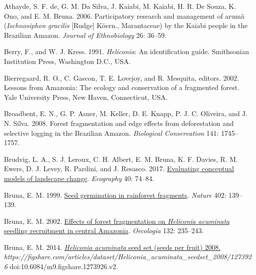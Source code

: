 \documentclass[
  12pt,
  man, donotrepeattitle,floatsintext]{apa6}
\newlength{\cslhangindent}
\newlength{\cslentryspacingunit} %
\newenvironment{CSLReferences}[2] %
 {%
  \setlength{\parindent}{0pt}
  \ifodd #1
  \let\oldpar\par
  \def\par{\hangindent=\cslhangindent\oldpar}
  \fi
  \setlength{\parskip}{#2\cslentryspacingunit}
 }%
 {}
\begin{document}
\hypertarget{refs}{}
\begin{CSLReferences}{1}{0}
\leavevmode{}%
Athayde, S. F. de, G. M. Da Silva, J. Kaiabi, M. Kaiabi, H. R. De Souza, K. Ono, and E. M. Bruna. 2006. Participatory research and management of arumã (\emph{{Ischnosiphon} gracilis} {[}{Rudge}{]} {Köern}., {Marantaceae}) by the {Kaiabi} people in the {Brazilian} {Amazon}. \emph{Journal of Ethnobiology} 26: 36--59.

\leavevmode{}%
Berry, F., and W. J. Kress. 1991. \emph{Heliconia}: An identification guide. Smithsonian Institution Press, Washington D.C., USA.

\leavevmode{}%
Bierregaard, R. O., C. Gascon, T. E. Lovejoy, and R. Mesquita, editors. 2002. Lessons from {Amazonia}: The ecology and conservation of a fragmented forest. Yale University Press, New Haven, Connecticut, USA.

\leavevmode{}%
Broadbent, E. N., G. P. Asner, M. Keller, D. E. Knapp, P. J. C. Oliveira, and J. N. Silva. 2008. Forest fragmentation and edge effects from deforestation and selective logging in the {Brazilian} {Amazon}. \emph{Biological Conservation} 141: 1745--1757.

\leavevmode{}%
Brudvig, L. A., S. J. Leroux, C. H. Albert, E. M. Bruna, K. F. Davies, R. M. Ewers, D. J. Levey, R. Pardini, and J. Resasco. 2017. \href{https://doi.org/10.1111/ecog.02543}{Evaluating conceptual models of landscape change}. \emph{Ecography} 40: 74--84.

\leavevmode{}%
Bruna, E. M. 1999. \href{https://doi.org/10.1038/45963}{Seed germination in rainforest fragments}. \emph{Nature} 402: 139--139.

\leavevmode{}%
Bruna, E. M. 2002. \href{https://doi.org/10.1007/s00442-002-0956-y}{Effects of forest fragmentation on \emph{{Heliconia} acuminata} seedling recruitment in central {Amazonia}}. \emph{Oecologia} 132: 235--243.

\leavevmode{}%
Bruna, E. M. 2014. \href{https://doi.org/10.6084/m9.figshare.1273926.v2}{\emph{{Heliconia} acuminata} seed set (seeds per fruit) 2008.} \emph{https://figshare.com/articles/dataset/Heliconia\_acuminata\_seedset\_2008/1273926} doi:10.6084/m9.figshare.1273926.v2.


\end{CSLReferences}
\end{document}
